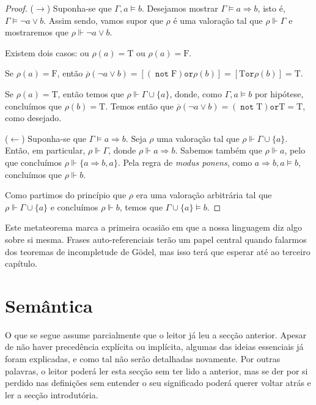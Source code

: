 \documentclass{report}
\theoremstyle{definition}
\theoremstyle{remark}
\newcommand{\lt}{\mathrm{T}}
\newcommand{\lf}{\mathrm{F}}
\DeclareMathOperator{\pnot}{\texttt{not}}
\newcommand{\por}{\mathbin{\texttt{or}}}
\newcommand{\imply}{\mathbin{\Rightarrow}}
\begin{document}
	\begin{proof}\label{dem:mtd}
	($\rightarrow$) Suponha-se que $\Gamma, a \vDash b$. Desejamos mostrar $\Gamma \vDash a \imply b$, isto é, $\Gamma \vDash \neg a \lor b$. Assim sendo, vamos supor que $\rho$ é uma valoração tal que $\rho \Vdash \Gamma$ e mostraremos que $\rho \Vdash \neg a \lor b$.
	
	Existem dois casos: ou $\rho(a) = \lt$ ou $\rho(a) = \lf$.
	
	Se $\rho(a) = \lf$, então $\overline\rho(\neg a \lor b) = [(\pnot \lf) \por \rho(b)] = [\lt \por \rho(b)] = \lt$.
	
	Se $\rho(a) = \lt$, então temos que $\rho \Vdash \Gamma \cup \{a\}$, donde, como $\Gamma, a \vDash b$ por hipótese, concluímos que $\rho(b) = \lt$. Temos então que $\overline\rho(\neg a \lor b) = (\pnot \lt) \por \lt = \lt$, como desejado.
	
	($\leftarrow$) Suponha-se que $\Gamma \vDash a \imply b$. Seja $\rho$ uma valoração tal que $\rho \Vdash \Gamma \cup \{a\}$. Então, em particular, $\rho \Vdash \Gamma$, donde $\rho \Vdash a \imply b$. Sabemos também que $\rho \Vdash a$, pelo que concluímos $\rho \Vdash \{a \imply b, a\}$. Pela regra de \textit{modus ponens}, como $a \imply b, a \vDash b$, concluímos que $\rho \Vdash b$.
	
	Como partimos do princípio que $\rho$ era uma valoração arbitrária tal que $\rho \Vdash \Gamma \cup \{a\}$ e concluímos $\rho \Vdash b$, temos que $\Gamma \cup \{a\} \vDash b$.
	\end{proof}
	
	Este metateorema marca a primeira ocasião em que a nossa linguagem diz algo sobre si mesma. Frases auto-referenciais terão um papel central quando falarmos dos teoremas de incompletude de Gödel, mas isso terá que esperar até ao terceiro capítulo.
	
	\section{Semântica}
	
	O que se segue assume parcialmente que o leitor já leu a secção anterior. Apesar de não haver precedência explícita ou implícita, algumas das ideias essenciais já foram explicadas, e como tal não serão detalhadas novamente. Por outras palavras, o leitor poderá ler esta secção sem ter lido a anterior, mas se der por si perdido nas definições sem entender o seu significado poderá querer voltar atrás e ler a secção introdutória.
	
\end{document}

